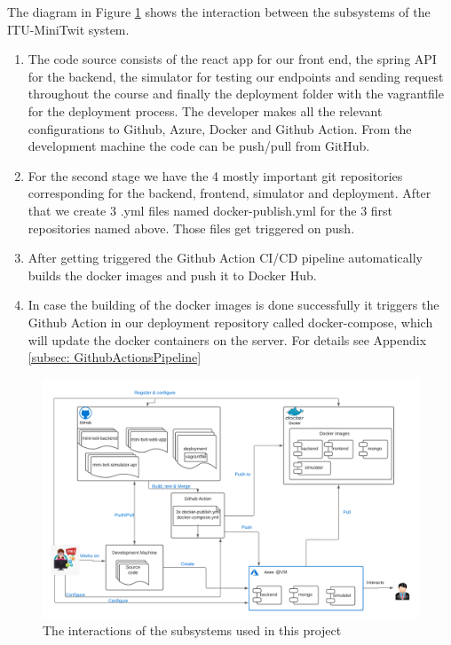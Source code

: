
The diagram in Figure \ref{fig:systemInteraction} shows the interaction between the subsystems of the ITU-MiniTwit system.

\begin{enumerate}
    \item The code source consists of the react app for our front end, the spring API for the backend, the simulator for testing our endpoints and sending request throughout the course and finally the deployment folder with the vagrantfile for the deployment process.  The developer makes all the relevant configurations to Github, Azure, Docker and Github Action. From the development machine the code can be push/pull from GitHub.
    \item For the second stage we have the 4 mostly important git repositories corresponding for the backend, frontend, simulator and deployment. After that we create 3 .yml files named docker-publish.yml for the 3 first repositories named above. Those files get triggered on push.
    \item After getting triggered the Github Action CI/CD pipeline automatically builds the docker images and push it to Docker Hub.
    \item In case the building of the docker images is done successfully it triggers the Github Action in our deployment repository called docker-compose, which will update the docker containers on the server. For details see Appendix \ref{subsec: GithubActionsPipeline}
\end{enumerate}

\begin{figure}[h]
    \centering
    \includegraphics[width = \textwidth]{images/NewSystemInteraction.png}
    \caption{The interactions of the subsystems used in this project}
    \label{fig:systemInteraction}
\end{figure}